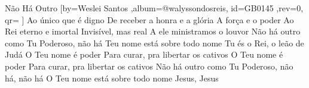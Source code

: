 \beginsong
{Não Há Outro %
}[by={Weslei Santos %
},album={@walyssondosreis},
id={GB0145 %
},rev={0}, %
qr={ %
}]
\beginverse*
Ao único que é digno
De receber a honra e a glória
A força e o poder
Ao Rei eterno e imortal
Invisível, mas real
A ele ministramos o louvor
\endverse
\beginverse*
Não há outro como Tu
Poderoso, não há
Teu nome está sobre todo nome
Tu és o Rei, o leão de Judá
\endverse
\beginverse*
O Teu nome é poder
Para curar, pra libertar os cativos
O Teu nome é poder
Para curar, pra libertar os cativos
\endverse
\beginchorus
Não há outro como Tu
Poderoso, não há, não há
O Teu nome está sobre todo nome
Jesus, Jesus
\endchorus


